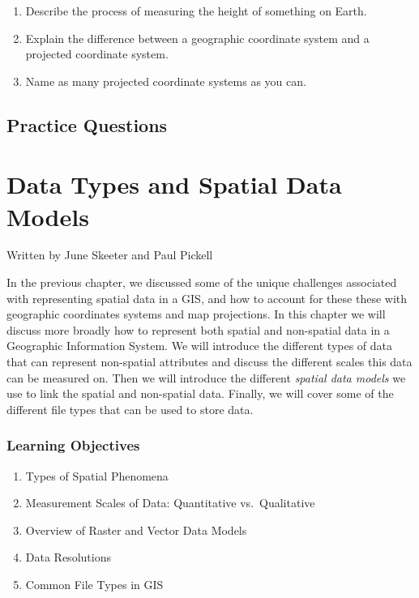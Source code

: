 \documentclass[
]{book}
\providecommand{\tightlist}{%
  \setlength{\itemsep}{0pt}\setlength{\parskip}{0pt}}
\begin{document}
\begin{enumerate}
\def\labelenumi{\arabic{enumi}.}
\tightlist
\item
  Describe the process of measuring the height of something on Earth.
\item
  Explain the difference between a geographic coordinate system and a projected coordinate system.
\item
  Name as many projected coordinate systems as you can.
\end{enumerate}

\hypertarget{practice-questions-1}{%
\section*{Practice Questions}\label{practice-questions-1}}

\hypertarget{types-of-data}{%
\chapter{Data Types and Spatial Data Models}\label{types-of-data}}

Written by
June Skeeter and Paul Pickell

In the previous chapter, we discussed some of the unique challenges associated with representing spatial data in a GIS, and how to account for these these with geographic coordinates systems and map projections. In this chapter we will discuss more broadly how to represent both spatial and non-spatial data in a Geographic Information System. We will introduce the different types of data that can represent non-spatial attributes and discuss the different scales this data can be measured on. Then we will introduce the different \emph{spatial data models} we use to link the spatial and non-spatial data. Finally, we will cover some of the different file types that can be used to store data.

\hypertarget{learning-objectives-2}{%
\subsection*{Learning Objectives}\label{learning-objectives-2}}

\begin{enumerate}
\def\labelenumi{\arabic{enumi}.}
\tightlist
\item
  Types of Spatial Phenomena
\item
  Measurement Scales of Data: Quantitative vs.~Qualitative
\item
  Overview of Raster and Vector Data Models
\item
  Data Resolutions
\item
  Common File Types in GIS
\end{enumerate}
\end{document}
